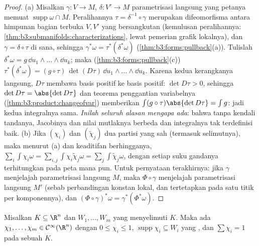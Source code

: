 \begin{proof}
(a) Misalkan $\gamma\colon V \to M$, $\delta\colon V' \to M$
parametrisasi langsung yang petanya memuat
$\operatorname{supp}\omega\cap M$. Peralihannya $\tau =
\delta^{-1}\circ\gamma$ merupakan difeomorfisma antara
himpunan bagian terbuka $V, V'$ yang bersangkutan (kemulusan peralihannya:
\cref{thm:b3:submanifolds:characterizations}, lewat pemerian
grafik lokalnya), dan $\gamma = \delta\circ\tau$ di sana, sehingga
$\gamma^*\omega = \tau^*(\delta^*\omega)$
(\cref{thm:b3:forms:pullback}(a)). Tulislah $\delta^*\omega =
g\,\dd u_1\wedge\dots\wedge\dd u_k$; maka
(\cref{thm:b3:forms:pullback}(c)) $\tau^*(\delta^*\omega) =
(g\circ\tau)\,\det(D\tau)\,\dd u_1\wedge\dots\wedge\dd u_k$.
Karena kedua kerangkanya langsung, $D\tau$ membawa basis positif ke
basis positif: $\det D\tau > 0$, sehingga $\det D\tau =
\abs{\det D\tau}$ dan teorema penggantian variabelnya
(\cref{thm:b3:product:changeofvar}) memberikan
$\int(g\circ\tau)\abs{\det D\tau} = \int g$: jadi kedua
integralnya sama. \emph{Inilah seluruh alasan mengapa 
ada}: bahwa tanpa kendali tandanya, Jacobinya dan nilai
mutlaknya berbeda dan integralnya tak terdefinisi baik.
(b) Jika $(\chi_i)$ dan $(\tilde\chi_j)$ dua partisi yang
sah (termasuk selimutnya), maka menurut (a) dan keaditifan
berhingganya, $\sum_i\int\chi_i\omega =
\sum_{i,j}\int\chi_i\tilde\chi_j\omega =
\sum_j\int\tilde\chi_j\omega$, dengan setiap suku gandanya terhitungkan
pada peta mana pun. Untuk pernyataan terakhirnya: jika $\gamma$ menjelajah
parametrisasi langsung $M$, maka $\Phi\circ\gamma$ menjelajah
parametrisasi langsung $M'$ (sebab perbandingan
 konstan lokal, dan tertetapkan pada satu titik per
komponennya), dan $(\Phi\circ\gamma)^*\omega =
\gamma^*(\Phi^*\omega)$.
\end{proof}

\begin{lemma}
\label{lem:b3:forms:partition}
Misalkan $K \subseteq \R^n$  dan $W_1, \dots, W_m$  yang menyelimuti $K$. Maka ada $\chi_1, \dots, \chi_m \in
\mathcal C^\infty(\R^n)$ dengan $0 \leq \chi_i \leq 1$,
$\operatorname{supp}\chi_i \subseteq W_i$ yang , dan
$\sum\chi_i = 1$ pada sebuah 
$K$.
\end{lemma}

